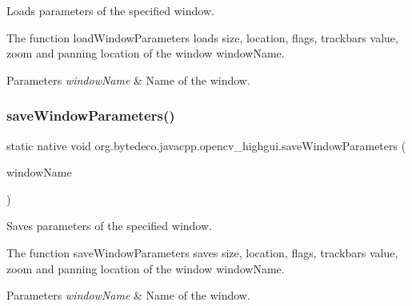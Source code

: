 Loads parameters of the specified window. 

The function load\+Window\+Parameters loads size, location, flags, trackbars value, zoom and panning location of the window window\+Name. 


\begin{DoxyParams}{Parameters}
{\em window\+Name} & Name of the window. \\
\hline
\end{DoxyParams}
\mbox{\label{group__highgui__qt_gac1ea25caaa8647ae67972ac417776344}} 
\subsubsection{\texorpdfstring{save\+Window\+Parameters()}{saveWindowParameters()}}
{\footnotesize\ttfamily static native void org.\+bytedeco.\+javacpp.\+opencv\+\_\+highgui.\+save\+Window\+Parameters (\begin{DoxyParamCaption}\item[{@Str Byte\+Pointer}]{window\+Name }\end{DoxyParamCaption})\hspace{0.3cm}{\ttfamily [static]}}



Saves parameters of the specified window. 

The function save\+Window\+Parameters saves size, location, flags, trackbars value, zoom and panning location of the window window\+Name. 


\begin{DoxyParams}{Parameters}
{\em window\+Name} & Name of the window. \\
\hline
\end{DoxyParams}
